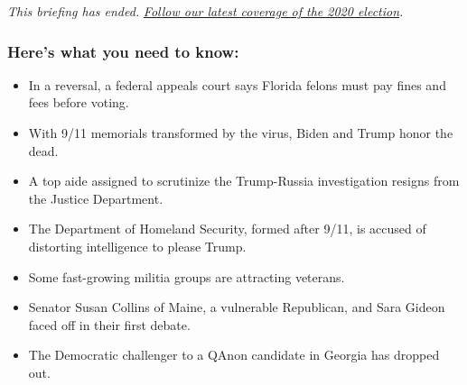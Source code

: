 \emph{This briefing has ended.}
\href{https://www.nytimes3xbfgragh.onion/news-event/2020-election}{\emph{Follow
our latest coverage of the 2020 election}}\emph{.}

\hypertarget{heres-what-you-need-to-know}{%
\subsubsection{Here's what you need to
know:}\label{heres-what-you-need-to-know}}

\begin{itemize}
\item
  \protect\hyperlink{in-a-reversal-a-federal-appeals-court-says-florida-felons-must-pay-fines-and-fees-before-voting}{}

  In a reversal, a federal appeals court says Florida felons must pay
  fines and fees before voting.
\item
  \protect\hyperlink{with-9-11-memorials-transformed-by-the-virus-biden-and-trump-honor-the-dead}{}

  With 9/11 memorials transformed by the virus, Biden and Trump honor
  the dead.
\item
  \protect\hyperlink{a-top-aide-assigned-to-scrutinize-the-trump-russia-investigation-resigns-from-the-justice-department}{}

  A top aide assigned to scrutinize the Trump-Russia investigation
  resigns from the Justice Department.
\item
  \protect\hyperlink{the-department-of-homeland-security-formed-after-9-11-is-accused-of-distorting-intelligence-to-please-trump}{}

  The Department of Homeland Security, formed after 9/11, is accused of
  distorting intelligence to please Trump.
\item
  \protect\hyperlink{some-fast-growing-militia-groups-are-attracting-veterans}{}

  Some fast-growing militia groups are attracting veterans.
\item
  \protect\hyperlink{senator-susan-collins-of-maine-a-vulnerable-republican-and-sara-gideon-faced-off-in-their-first-debate}{}

  Senator Susan Collins of Maine, a vulnerable Republican, and Sara
  Gideon faced off in their first debate.
\item
  \protect\hyperlink{the-democratic-challenger-to-a-qanon-candidate-in-georgia-has-dropped-out}{}

  The Democratic challenger to a QAnon candidate in Georgia has dropped
  out.
\end{itemize}

